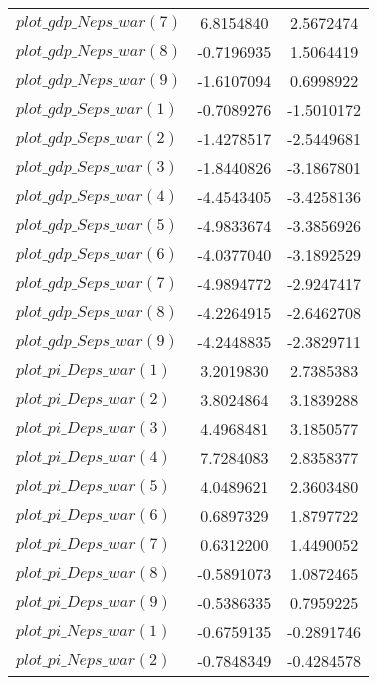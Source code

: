 \begin{center}
\begin{longtable}{lcc}
$plot\_gdp\_N eps\_war (7)  $	 & 	      6.8154840	 & 	      2.5672474 \\ 
$plot\_gdp\_N eps\_war (8)  $	 & 	     -0.7196935	 & 	      1.5064419 \\ 
$plot\_gdp\_N eps\_war (9)  $	 & 	     -1.6107094	 & 	      0.6998922 \\ 
$plot\_gdp\_S eps\_war (1)  $	 & 	     -0.7089276	 & 	     -1.5010172 \\ 
$plot\_gdp\_S eps\_war (2)  $	 & 	     -1.4278517	 & 	     -2.5449681 \\ 
$plot\_gdp\_S eps\_war (3)  $	 & 	     -1.8440826	 & 	     -3.1867801 \\ 
$plot\_gdp\_S eps\_war (4)  $	 & 	     -4.4543405	 & 	     -3.4258136 \\ 
$plot\_gdp\_S eps\_war (5)  $	 & 	     -4.9833674	 & 	     -3.3856926 \\ 
$plot\_gdp\_S eps\_war (6)  $	 & 	     -4.0377040	 & 	     -3.1892529 \\ 
$plot\_gdp\_S eps\_war (7)  $	 & 	     -4.9894772	 & 	     -2.9247417 \\ 
$plot\_gdp\_S eps\_war (8)  $	 & 	     -4.2264915	 & 	     -2.6462708 \\ 
$plot\_gdp\_S eps\_war (9)  $	 & 	     -4.2448835	 & 	     -2.3829711 \\ 
$plot\_pi\_D eps\_war (1)   $	 & 	      3.2019830	 & 	      2.7385383 \\ 
$plot\_pi\_D eps\_war (2)   $	 & 	      3.8024864	 & 	      3.1839288 \\ 
$plot\_pi\_D eps\_war (3)   $	 & 	      4.4968481	 & 	      3.1850577 \\ 
$plot\_pi\_D eps\_war (4)   $	 & 	      7.7284083	 & 	      2.8358377 \\ 
$plot\_pi\_D eps\_war (5)   $	 & 	      4.0489621	 & 	      2.3603480 \\ 
$plot\_pi\_D eps\_war (6)   $	 & 	      0.6897329	 & 	      1.8797722 \\ 
$plot\_pi\_D eps\_war (7)   $	 & 	      0.6312200	 & 	      1.4490052 \\ 
$plot\_pi\_D eps\_war (8)   $	 & 	     -0.5891073	 & 	      1.0872465 \\ 
$plot\_pi\_D eps\_war (9)   $	 & 	     -0.5386335	 & 	      0.7959225 \\ 
$plot\_pi\_N eps\_war (1)   $	 & 	     -0.6759135	 & 	     -0.2891746 \\ 
$plot\_pi\_N eps\_war (2)   $	 & 	     -0.7848349	 & 	     -0.4284578 \\ 

\end{longtable}
\end{center}
